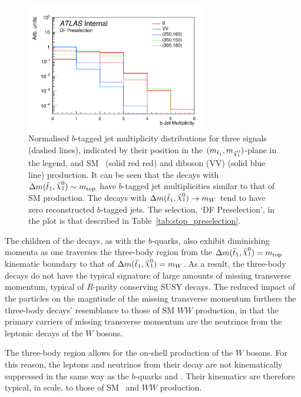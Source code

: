 \begin{figure}[!htb]
    \begin{center}
        \includegraphics[width=0.7\textwidth]{figures/search_stop2l/strategy/comp_plots/dfpresel_nBJets}
        \caption{
            Normalised $b$-tagged jet multiplicity distributions for three \stopone signals (dashed lines),
            indicated by their position in the $(m_{\stopone}, m_{\ninoone})$-plane in the legend,
            and SM \ttbar~(solid red red) and diboson (VV) (solid blue line) production.
            It can be seen that the \stopone decays with $\sdiff \sim m_{\text{top}}$ have $b$-tagged jet
            multiplicities similar to that of SM \ttbar production.
            The \stopone decays with $\sdiff \rightarrow m_W$ tend to have zero reconstructed $b$-tagged jets.
            The selection, `DF Preselection', in the plot is that described in Table~\ref{tab:stop_preselection}.
        }
        \label{fig:stop_nbjets}
    \end{center}
\end{figure}

The \ninoone children of the \stopone decays, as with the $b$-quarks, also exhibit diminishing
momenta as one traverses the three-body region from the $\sdiff = m_{\text{top}}$ kinematic boundary to that of $\sdiff = m_W$.
As a result, the three-body \stopone decays do not have the typical signature of large
amounts of missing transverse momentum, typical of $R$-parity conserving SUSY decays.
The reduced impact of the \ninoone particles on the magntiude of the missing transverse momentum
furthers the three-body \stopone decays' resemblance to those of SM $WW$ production, in that
the primary carriers of missing transverse momentum are the neutrinos from the leptonic decays
of the $W$ bosons.

The three-body region allows for the on-shell production of the $W$ bosons.
For this reason, the leptons and neutrinos from their decay are not kinematically suppressed
in the same way as the $b$-quarks and \ninoone.
Their kinematics are therefore typical, in scale, to those of SM \ttbar~and $WW$ production.


